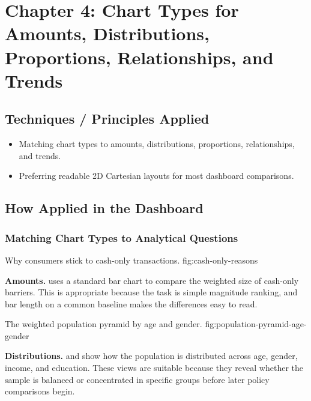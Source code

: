 \documentclass[../main.tex]{subfiles}
\begin{document}
\section{Chapter 4: Chart Types for Amounts, Distributions, Proportions, Relationships, and Trends}
\label{sec:chapter4-chart-types}

\subsection{Techniques / Principles Applied}

\begin{itemize}[leftmargin=*]
\item Matching chart types to amounts, distributions, proportions,
relationships, and trends.
\item Preferring readable 2D Cartesian layouts for most dashboard comparisons.
\end{itemize}

\subsection{How Applied in the Dashboard}

\subsubsection{Matching Chart Types to Analytical Questions}

{Why consumers stick to cash-only transactions.}
{fig:cash-only-reasons}

\textbf{Amounts.}  uses a
standard bar chart to compare the weighted size of cash-only barriers. This is
appropriate because the task is simple magnitude ranking, and bar length on a
common baseline makes the differences easy to read.

{The weighted population pyramid by age and gender.}
{fig:population-pyramid-age-gender}

\textbf{Distributions.} 
and  show how the
population is distributed across age, gender, income, and education. These
views are suitable because they reveal whether the sample is balanced or
concentrated in specific groups before later policy comparisons begin.
\end{document}
